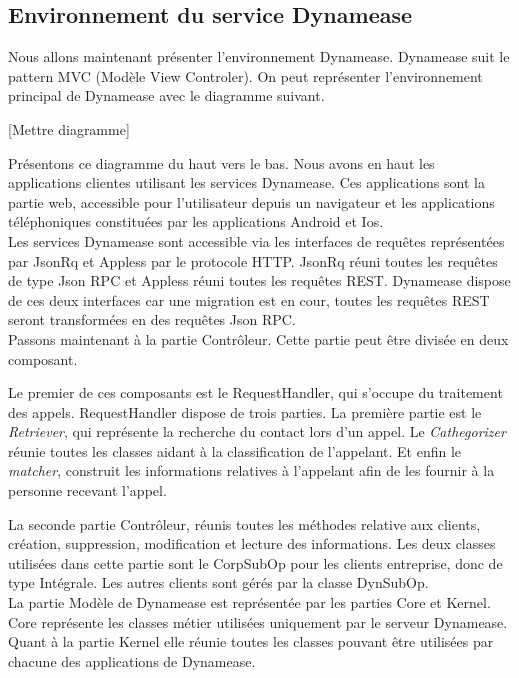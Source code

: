 \subsection{Environnement du service Dynamease}

Nous allons maintenant présenter l'environnement Dynamease. Dynamease suit le pattern MVC (Modèle View Controler). On peut représenter l'environnement principal de Dynamease avec le diagramme suivant.

[Mettre diagramme]

Présentons ce diagramme du haut vers le bas. Nous avons en haut les applications clientes utilisant les services Dynamease. Ces applications sont la partie web, accessible pour l'utilisateur depuis un navigateur et les applications téléphoniques constituées par les applications Android et Ios.\\

Les services Dynamease sont accessible via les interfaces de requêtes représentées par JsonRq et Appless par le protocole HTTP. JsonRq réuni toutes les requêtes de type Json RPC et Appless réuni toutes les requêtes REST. Dynamease dispose de ces deux interfaces car une migration est en cour, toutes les requêtes REST seront transformées en des requêtes Json RPC.\\

Passons maintenant à la partie Contrôleur. Cette partie peut être divisée en deux composant.

Le premier de ces composants est le RequestHandler, qui s'occupe du traitement des appels. RequestHandler dispose de trois parties. La première partie est le \textit{Retriever}, qui représente la recherche du contact lors d'un appel. Le \textit{Cathegorizer} réunie toutes les classes aidant à la classification de l'appelant. Et enfin le \textit{matcher}, construit les informations relatives à l'appelant afin de les fournir à la personne recevant l'appel.

La seconde partie Contrôleur, réunis toutes les méthodes relative aux clients, création, suppression, modification et lecture des informations. Les deux classes utilisées dans cette partie sont le CorpSubOp pour les clients entreprise, donc de type Intégrale. Les autres clients sont gérés par la classe DynSubOp.\\

La partie Modèle de Dynamease est représentée par les parties Core et Kernel. Core représente les classes métier utilisées uniquement par le serveur Dynamease. Quant à la partie Kernel elle réunie toutes les classes pouvant être utilisées par chacune des applications de Dynamease.\\

